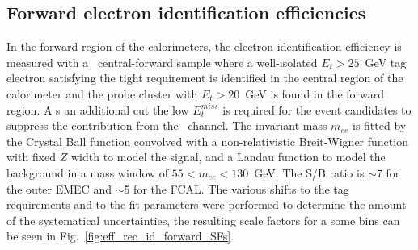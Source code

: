 \begin{figure}
\end{figure}

\subsection{Forward electron identification efficiencies}

In the forward region of the calorimeters, the electron identification efficiency is measured with a \Zee\ central-forward sample  where  a  well-isolated $E_{t} > 25$~GeV tag  electron satisfying the tight requirement is identified in the central region of the calorimeter and the probe cluster with $E_{t} > 20$~GeV is found in the forward region. A s an additional cut the low $E_{t}^{miss}$ is required for the event candidates to suppress the contribution from the \Wenu\ channel.
The invariant mass $m_{ee}$ is fitted by the Crystal Ball function convolved with a non-relativistic Breit-Wigner function with fixed $Z$ width to model the signal, and a Landau function to model the background in a mass window of $55 < m_{ee} < 130$~GeV. The S/B ratio is $\sim$7 for the outer EMEC and $\sim$5 for the FCAL. The various shifts to the tag requirements and to the fit parameters were performed to determine the amount of the systematical uncertainties, the resulting scale factors for a some bins can be seen in Fig.~\ref{fig:eff_rec_id_forward_SFs}.


